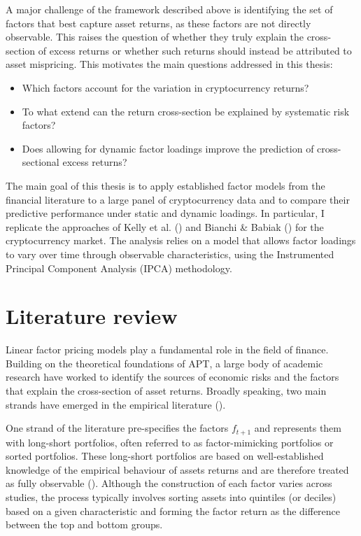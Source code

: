 \documentclass[
  12pt,
  a4paper,
  openany]{scrbook}
\providecommand{\tightlist}{%
  \setlength{\itemsep}{0pt}\setlength{\parskip}{0pt}}
\begin{document}
A major challenge of the framework described above is identifying the
set of factors that best capture asset returns, as these factors are not
directly observable. This raises the question of whether they truly
explain the cross-section of excess returns or whether such returns
should instead be attributed to asset mispricing. This motivates the
main questions addressed in this thesis:

\begin{itemize}
\tightlist
\item
  Which factors account for the variation in cryptocurrency returns?
\item
  To what extend can the return cross-section be explained by systematic
  risk factors?
\item
  Does allowing for dynamic factor loadings improve the prediction of
  cross-sectional excess returns?
\end{itemize}

The main goal of this thesis is to apply established factor models from
the financial literature to a large panel of cryptocurrency data and to
compare their predictive performance under static and dynamic loadings.
In particular, I replicate the approaches of Kelly et al.
() and Bianchi \& Babiak
() for the
cryptocurrency market. The analysis relies on a model that allows factor
loadings to vary over time through observable characteristics, using the
Instrumented Principal Component Analysis (IPCA) methodology.

\hfill\break
\hfill\break

\section{Literature review}\label{literature-review}

Linear factor pricing models play a fundamental role in the field of
finance. Building on the theoretical foundations of APT, a large body of
academic research have worked to identify the sources of economic risks
and the factors that explain the cross-section of asset returns. Broadly
speaking, two main strands have emerged in the empirical literature
().

One strand of the literature pre-specifies the factors \(f_{t+1}\) and
represents them with long-short portfolios, often referred to as
factor-mimicking portfolios or sorted portfolios. These long-short
portfolios are based on well-established knowledge of the empirical
behaviour of assets returns and are therefore treated as fully
observable (). Although the construction of each factor varies across studies,
the process typically involves sorting assets into quintiles (or
deciles) based on a given characteristic and forming the factor return
as the difference between the top and bottom groups.
\end{document}

